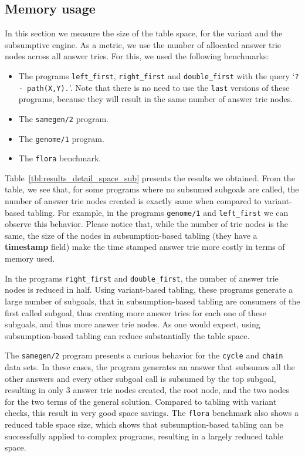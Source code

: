 \subsection{Memory usage}

In this section we measure the size of the table space, for the variant and the subsumptive engine.
As a metric, we use the number of allocated answer trie nodes across all answer tries.
For this, we used the following benchmarks:

\begin{itemize}
   \item The programs \texttt{left\_first}, \texttt{right\_first} and \texttt{double\_first} with the query `\texttt{?-~path(X,Y).}'. Note that there is no need to use
   the \texttt{last} versions of these programs, because they will result in the same number of answer trie nodes.
   
   \item The \texttt{samegen/2} program.
   
   \item The \texttt{genome/1} program.
   
   \item The \texttt{flora} benchmark.
\end{itemize}

Table~\ref{tbl:results_detail_space_sub} presents the results we obtained. From the table, we see that,
for some programs where no subsumed subgoals are called, the number of answer trie nodes created is
exactly same when compared to variant-based tabling. For example, in the programs \texttt{genome/1} and
\texttt{left\_first} we can observe this behavior. Please notice that, while the number of trie nodes is
the same, the size of the nodes in subsumption-based tabling (they have a \textbf{timestamp} field) make
the time stamped answer trie more costly in terms of memory used.

In the programs \texttt{right\_first} and \texttt{double\_first}, the number of answer trie nodes
is reduced in half. Using variant-based tabling, these programs generate a large number of subgoals,
that in subsumption-based tabling are consumers of the first called subgoal, thus creating more
answer tries for each one of these subgoals, and thus more answer trie nodes. As one would expect,
using subsumption-based tabling can reduce substantially the table space.

The \texttt{samegen/2} program presents a curious behavior for the \texttt{cycle} and \texttt{chain}
data sets. In these cases, the program generates an answer that subsumes all the other answers and
every other subgoal call is subsumed by the top subgoal, resulting in only 3 answer trie nodes created,
the root node, and the two nodes for the two terms of the general solution. Compared to tabling with
variant checks, this result in very good space savings.
The \texttt{flora} benchmark also shows a reduced table space size, which shows that subsumption-based
tabling can be successfully applied to complex programs, resulting in a largely reduced
table space.

